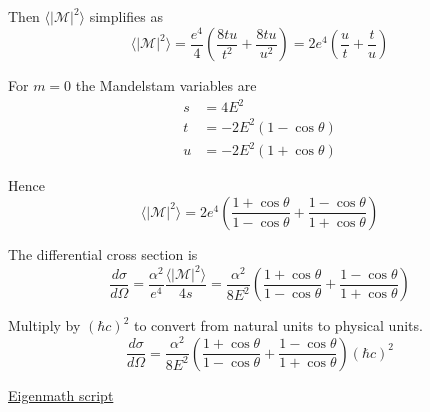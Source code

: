 Then $\langle|\mathcal{M}|^2\rangle$ simplifies as
\begin{equation*}
\langle|\mathcal{M}|^2\rangle
=\frac{e^4}{4}\left(\frac{8tu}{t^2}+\frac{8tu}{u^2}\right)
=2e^4\left(\frac{u}{t}+\frac{t}{u}\right)
\end{equation*}

For $m=0$ the Mandelstam variables are
\begin{align*}
s&=4E^2
\\
t&=-2E^2(1-\cos\theta)
\\
u&=-2E^2(1+\cos\theta)
\end{align*}

Hence
\begin{equation*}
\langle|\mathcal{M}|^2\rangle
=2e^4\left(\frac{1+\cos\theta}{1-\cos\theta}+\frac{1-\cos\theta}{1+\cos\theta}\right)
\end{equation*}

The differential cross section is
\begin{equation*}
\frac{d\sigma}{d\Omega}
=\frac{\alpha^2}{e^4}\frac{\langle|\mathcal{M}|^2\rangle}{4s}
=\frac{\alpha^2}{8E^2}
\left(\frac{1+\cos\theta}{1-\cos\theta}+\frac{1-\cos\theta}{1+\cos\theta}\right)
\end{equation*}

Multiply by $(\hbar c)^2$ to convert from natural units to physical units.
\begin{equation*}
\frac{d\sigma}{d\Omega}
=\frac{\alpha^2}{8E^2}
\left(\frac{1+\cos\theta}{1-\cos\theta}+\frac{1-\cos\theta}{1+\cos\theta}\right)
(\hbar c)^2
\end{equation*}

\href{https://georgeweigt.github.io/examples/annihilation-demo.html}{Eigenmath script}


